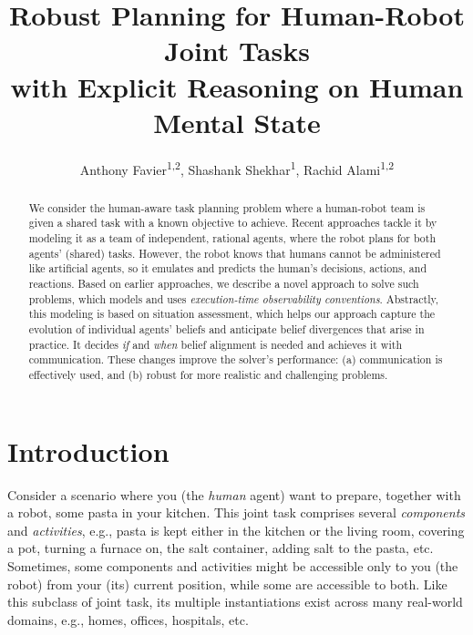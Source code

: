 \documentclass[letterpaper]{article} %
\title
{
Robust Planning for Human-Robot Joint Tasks \\ with Explicit Reasoning on Human Mental State
}
\author{
    Anthony Favier\textsuperscript{\rm 1,2},
    Shashank Shekhar\textsuperscript{\rm 1},
    Rachid Alami\textsuperscript{\rm 1,2}
}
\begin{document}


\maketitle

\begin{abstract}
We consider the human-aware task planning problem where a human-robot team is given a shared task with a known objective to achieve. Recent approaches tackle it by modeling it as a team of independent, rational agents, where the robot plans for both agents' (shared) tasks. However, the robot knows that humans cannot be administered like artificial agents, so it emulates and predicts the human's decisions, actions, and reactions. 
Based on earlier approaches,
we describe a novel approach to solve such problems, which models and uses {\em execution-time observability conventions}. 
Abstractly, this modeling is based on situation assessment, which helps our approach capture the evolution of individual agents' beliefs and anticipate belief divergences that arise in practice.
It decides {\em if} and {\em when} belief alignment is needed and achieves it with communication.
These changes improve the solver's performance: (a) communication is effectively used, and (b) robust for more realistic and challenging problems.
\end{abstract}

\section{Introduction}

Consider a scenario where you (the \textit{human} agent) want to prepare, together with a robot, some pasta in your kitchen. This joint task comprises several \textit{components} and \textit{activities}, e.g., pasta is kept either in the kitchen or the living room, covering a pot, turning a furnace on, 
the salt container, adding salt to the pasta, etc. 
Sometimes, some components and activities might be accessible only to you (the robot) from your (its) current position, while some are accessible to both. 
Like this subclass of joint task, its multiple instantiations exist across many real-world domains, e.g., homes, offices, hospitals, etc.
\end{document}
